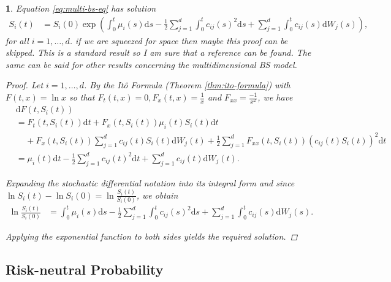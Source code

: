 \documentclass[english]{article}
\newcommand{\comment}[1]{\color{blue}#1\color{black}}
\numberwithin{equation}{section}
\numberwithin{figure}{section}
\theoremstyle{bolddescit}
\newtheorem{theorem}{\protect\theoremname}[section]
\theoremstyle{definition}
\theoremstyle{definition}
\theoremstyle{plain}
\theoremstyle{plain}
\theoremstyle{bolddesc}
\theoremstyle{plain}
\theoremstyle{remark}
\providecommand{\theoremname}{Theorem}
\begin{document}
\begin{theorem}\label{thm:bs-solution}
  Equation \eqref{eq:multi-bs-eq} has solution
  \begin{align*}
    S_i(t) &= S_i(0) \exp \left( \int_0^t \mu_i(s) \mathrm{d}s - \frac{1}{2} \sum_{j=1}^{d} \int_0^t c_{ij}(s)^2 \mathrm{d}s + \sum_{j=1}^d \int_0^t c_{ij}(s) \mathrm{d}W_j(s) \right),
  \end{align*}
  for all $i=1,\ldots,d$.
\comment{if we are squeezed for space then maybe this proof can be skipped. This is a standard result so I am sure that a reference can be found. The same can be said for other results concerning the multidimensional BS model.}

  \begin{proof}
    Let $i = 1,\ldots,d$. By the It\^o Formula (Theorem \ref{thm:ito-formula}) with $F(t,x) = \ln x$ so that $F_t(t,x) = 0, F_x(t,x) = \frac{1}{x}$ and $F_{xx} = \frac{-1}{x^2}$, we have
    \begin{align*}
      &\mathrm{d}F(t,S_i(t))\\
      &= F_t(t,S_i(t)) \mathrm{d}t + F_x(t,S_i(t)) \mu_i(t) S_i(t) \mathrm{d}t\\
      &\ \ \ \ \ + F_x(t,S_i(t)) \sum_{j=1}^d c_{ij}(t) S_i(t) \mathrm{d}W_j(t) + \frac{1}{2} \sum_{j=1}^d F_{xx}(t,S_i(t)) (c_{ij}(t) S_i(t))^2 \mathrm{d}t\\
      &= \mu_i(t) \mathrm{d}t
      - \frac{1}{2} \sum_{j=1}^d c_{ij}(t)^2 \mathrm{d}t
      + \sum_{j=1}^d c_{ij}(t) \mathrm{d}W_j(t).
    \end{align*}

    Expanding the stochastic differential notation into its integral form and since $\ln S_i(t) - \ln S_i(0) = \ln \frac{S_i(t)}{S_i(0)}$, we obtain
    \begin{align*}
      \ln \frac{S_i(t)}{S_i(0)}
      &= \int_0^t \mu_i(s) \mathrm{d}s
      - \frac{1}{2} \sum_{j=1}^d \int_0^t c_{ij}(s)^2 \mathrm{d}s
      + \sum_{j=1}^d \int_0^t c_{ij}(s) \mathrm{d}W_j(s).
    \end{align*}

    Applying the exponential function to both sides yields the required solution.
  \end{proof}
\end{theorem}

\subsection{Risk-neutral Probability}
\end{document}
